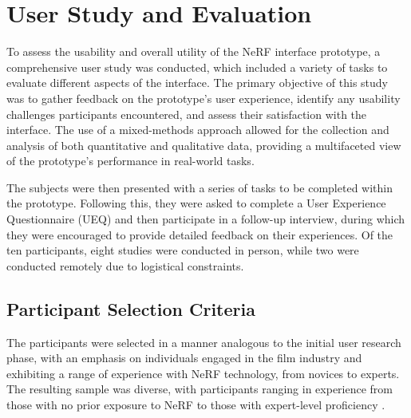 %
\chapter{User Study and Evaluation}
\label{sec:study}

To assess the usability and overall utility of the NeRF interface prototype, a comprehensive user study was conducted, which included a variety of tasks to evaluate different aspects of the interface. 
The primary objective of this study was to gather feedback on the prototype's user experience, identify any usability challenges participants encountered, and assess their satisfaction with the interface. 
The use of a mixed-methods approach allowed for the collection and analysis of both quantitative and qualitative data, providing a multifaceted view of the prototype's performance in real-world tasks.

The subjects were then presented with a series of tasks to be completed within the prototype.
Following this, they were asked to complete a User Experience Questionnaire (UEQ) and then participate in a follow-up interview, during which they were encouraged to provide detailed feedback on their experiences.
Of the ten participants, eight studies were conducted in person, while two were conducted remotely due to logistical constraints.

\section{Participant Selection Criteria}
\label{sec:study:criteria}

The participants were selected in a manner analogous to the initial user research phase, with an emphasis on individuals engaged in the film industry and exhibiting a range of experience with NeRF technology, from novices to experts.
The resulting sample was diverse, with participants ranging in experience from those with no prior exposure to NeRF to those with expert-level proficiency .

